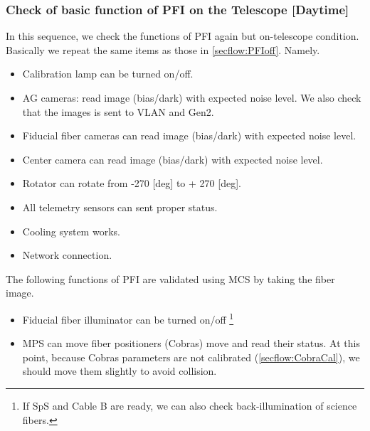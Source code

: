 \subsubsection{Check of basic function of PFI on the Telescope [Daytime]}\label{secflow:PFIon}


In this sequence, we check the functions of PFI again but on-telescope condition.
Basically we repeat the same items as those in \ref{secflow:PFIoff}.
Namely.
\begin{itemize}
\item Calibration lamp can be turned on/off.
\item AG cameras: read image (bias/dark) with expected noise level.
We also check that the images is sent to VLAN and Gen2.
\item Fiducial fiber cameras can read image (bias/dark) with expected noise level.
\item Center camera can read image (bias/dark) with expected noise level.
\item Rotator can rotate from -270 [deg] to + 270 [deg].
\item All telemetry sensors can sent proper status.
\item Cooling system works.
\item Network connection.
\end{itemize}

The following functions of PFI are validated using MCS by taking the fiber image.
\begin{itemize}
\item Fiducial fiber illuminator can be  turned on/off \footnote{If SpS and Cable B are ready, we can also check back-illumination of science fibers.}
\item MPS can move fiber positioners (Cobras) move and read their status.
At this point, because Cobras parameters are not calibrated (\ref{secflow:CobraCal}), we should move them slightly to avoid collision.
\end{itemize}

